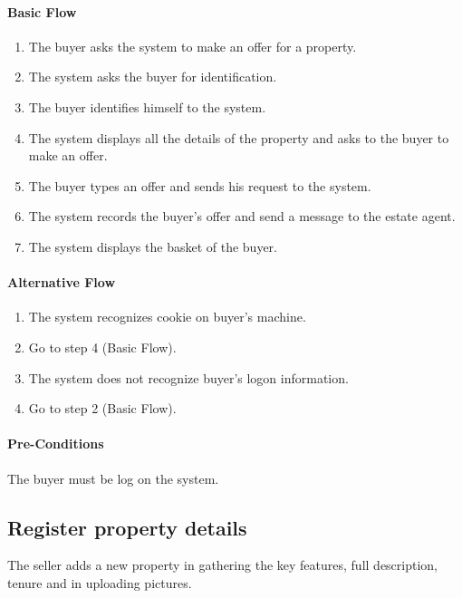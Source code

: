 \documentclass[a4paper,12pt]{article}
\begin{document}
\paragraph{Basic Flow}
\begin{enumerate}
\item The buyer asks the system to make an offer for a property.
\item The system asks the buyer for identification.
\item The buyer identifies himself to the system.
\item The system displays all the details of the property and asks to the buyer to make an offer.
\item The buyer types an offer and sends his request to the system.
\item The system records the buyer's offer and send a message to the estate agent.
\item The system displays the basket of the buyer.
\end{enumerate}
\paragraph{Alternative Flow}
\begin{enumerate}
\item The system recognizes cookie on buyer's machine. 
\item Go to step 4 (Basic Flow).
\item The system does not recognize buyer's logon information.
\item Go to step 2 (Basic Flow).
\end{enumerate}
\paragraph{Pre-Conditions}
The buyer must be log on the system.

\subsection{Register property details}
The seller adds a new property in gathering the key features, full description, tenure and in uploading pictures.
\end{document}
